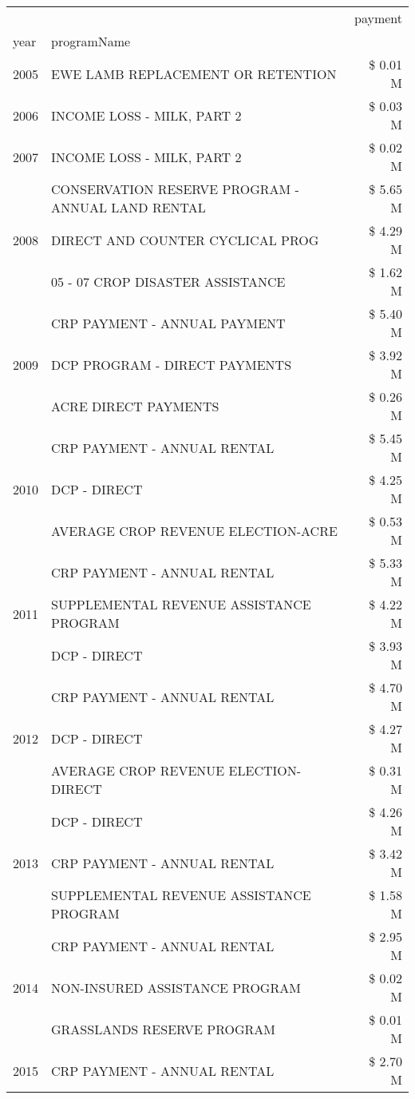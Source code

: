 \begin{tabular}{llr}
\toprule
 &  & payment \\
year & programName &  \\
\midrule
2005 & EWE LAMB REPLACEMENT OR RETENTION & \$ 0.01 M \\
\cline{1-3}
2006 & INCOME LOSS - MILK, PART 2 & \$ 0.03 M \\
\cline{1-3}
2007 & INCOME LOSS - MILK, PART 2 & \$ 0.02 M \\
\cline{1-3}
\multirow[t]{3}{*}{2008} & CONSERVATION RESERVE PROGRAM - ANNUAL LAND RENTAL & \$ 5.65 M \\
 & DIRECT AND COUNTER CYCLICAL PROG & \$ 4.29 M \\
 & 05 - 07 CROP DISASTER ASSISTANCE & \$ 1.62 M \\
\cline{1-3}
\multirow[t]{3}{*}{2009} & CRP PAYMENT - ANNUAL PAYMENT & \$ 5.40 M \\
 & DCP PROGRAM - DIRECT PAYMENTS & \$ 3.92 M \\
 & ACRE DIRECT PAYMENTS & \$ 0.26 M \\
\cline{1-3}
\multirow[t]{3}{*}{2010} & CRP PAYMENT - ANNUAL RENTAL & \$ 5.45 M \\
 & DCP - DIRECT & \$ 4.25 M \\
 & AVERAGE CROP REVENUE ELECTION-ACRE & \$ 0.53 M \\
\cline{1-3}
\multirow[t]{3}{*}{2011} & CRP PAYMENT - ANNUAL RENTAL & \$ 5.33 M \\
 & SUPPLEMENTAL REVENUE ASSISTANCE PROGRAM & \$ 4.22 M \\
 & DCP - DIRECT & \$ 3.93 M \\
\cline{1-3}
\multirow[t]{3}{*}{2012} & CRP PAYMENT - ANNUAL RENTAL & \$ 4.70 M \\
 & DCP - DIRECT & \$ 4.27 M \\
 & AVERAGE CROP REVENUE ELECTION-DIRECT & \$ 0.31 M \\
\cline{1-3}
\multirow[t]{3}{*}{2013} & DCP - DIRECT & \$ 4.26 M \\
 & CRP PAYMENT - ANNUAL RENTAL & \$ 3.42 M \\
 & SUPPLEMENTAL REVENUE ASSISTANCE PROGRAM & \$ 1.58 M \\
\cline{1-3}
\multirow[t]{3}{*}{2014} & CRP PAYMENT - ANNUAL RENTAL & \$ 2.95 M \\
 & NON-INSURED ASSISTANCE PROGRAM & \$ 0.02 M \\
 & GRASSLANDS RESERVE PROGRAM & \$ 0.01 M \\
\cline{1-3}
\multirow[t]{3}{*}{2015} & CRP PAYMENT - ANNUAL RENTAL & \$ 2.70 M \\

\end{tabular}
